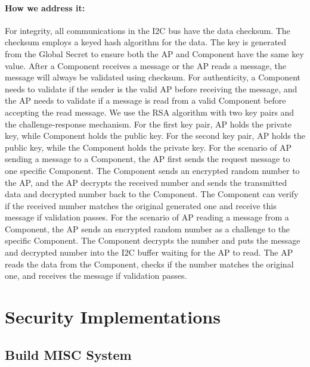 \documentclass[11pt,oneside,onecolumn,letterpaper]{article}
\newcounter{alg}
\begin{document}
\paragraph{How we address it:}
For integrity,
all communications in the I2C bus have the data checksum.
The checksum employs a keyed hash algorithm for the data.
The key is generated from the Global Secret to ensure both the AP and Component have the same key value.
After a Component receives a message or the AP reads a message,
the message will always be validated using checksum.
For authenticity,
a Component needs to validate if the sender is the valid AP before receiving the message,
and the AP needs to validate if a message is read from a valid Component before accepting the read message.
We use the RSA algorithm with two key pairs and the challenge-response mechanism.
For the first key pair,
AP holds the private key,
while Component holds the public key.
For the second key pair,
AP holds the public key,
while the Component holds the private key.
For the scenario of AP sending a message to a Component,
the AP first sends the request message to one specific Component.
The Component sends an encrypted random number to the AP,
and the AP decrypts the received number and sends the transmitted data and decrypted number back to the Component.
The Component can verify if the received number matches the original generated one and receive this message if validation passes.
For the scenario of AP reading a message from a Component,
the AP sends an encrypted random number as a challenge to the specific Component.
The Component decrypts the number and puts the message and decrypted number into the I2C buffer waiting for the AP to read.
The AP reads the data from the Component,
checks if the number matches the original one,
and receives the message if validation passes.


\section{Security Implementations}


\subsection{Build MISC System}
\end{document}

